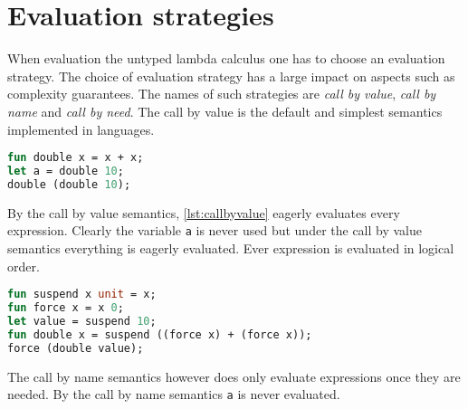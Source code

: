 \documentclass[11pt,oneside,a4paper]{report}
\begin{document}
\section{Evaluation strategies}
When evaluation the untyped lambda calculus one has to choose an evaluation strategy.
The choice of evaluation strategy has a large impact on aspects such as complexity guarantees.
The names of such strategies are \textit{call by value}, \textit{call by name} and \textit{call by need}.
The call by value is the default and simplest semantics implemented in languages.
\begin{lstlisting}[language=ML,caption={Program that doubles values},label={lst:callbyvalue},mathescape=true]
fun double x = x + x;
let a = double 10;
double (double 10);
\end{lstlisting}
By the call by value semantics, \autoref{lst:callbyvalue} eagerly evaluates every expression.
Clearly the variable \texttt{a} is never used but under the call by value semantics everything is eagerly evaluated.
Ever expression is evaluated in logical order.
\begin{lstlisting}[language=ML,caption={Implementation of call by name},label={lst:callbyname},mathescape=true]
fun suspend x unit = x;
fun force x = x 0;
let value = suspend 10;
fun double x = suspend ((force x) + (force x));
force (double value);
\end{lstlisting}
The call by name semantics however does only evaluate expressions once they are needed.
By the call by name semantics \texttt{a} is never evaluated.
\end{document}
